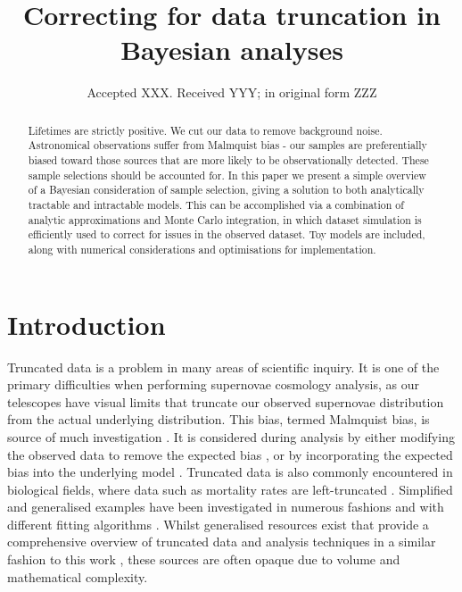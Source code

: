 \documentclass[a4paper,fleqn,usenatbib]{mnras}
\title[Correcting for data truncation in Bayesian analyses]{Correcting for data truncation in Bayesian analyses}
\author[S. R. Hinton et al.]{Samuel R. Hinton,$^{1,2}$\thanks{E-mail: \href{samuelreay@gmail.com}}
	Alex Kim,$^{3}$
	Tamara M. Davis,$^{1,2}$
\\
$^{1}$School of Mathematics and Physics, The University of Queensland, Brisbane, QLD 4072, Australia\\
$^{2}$ARC Centre of Excellence for All-sky Astrophysics (CAASTRO)\\
$^{3}$Lawrence Berkeley National Labs
}
\date{Accepted XXX. Received YYY; in original form ZZZ}
\begin{document}
\label{firstpage}
\pagerange{\pageref{firstpage}--\pageref{lastpage}}
\maketitle





\begin{abstract}
Lifetimes are strictly positive. We cut our data to remove background noise.  Astronomical observations suffer from Malmquist bias - our samples are preferentially biased toward those sources that are more likely to be observationally detected. These sample selections should be accounted for. In this paper we present a simple overview of a Bayesian consideration of sample selection, giving a solution to both analytically tractable and intractable models. This can be accomplished via a combination of analytic approximations and Monte Carlo integration, in which dataset simulation is efficiently used to correct for issues in the observed dataset. Toy models are included, along with numerical considerations and optimisations for implementation.
\end{abstract}








\section{Introduction}

Truncated data is a problem in many areas of scientific inquiry. It is one of the primary difficulties when performing supernovae cosmology analysis, as our telescopes have visual limits that truncate our observed supernovae distribution from the actual underlying distribution. This bias, termed Malmquist bias, is source of much investigation \citep{Butkevich2005}. It is considered during analysis by either modifying the observed data to remove the expected bias \citep{BetouleKessler2014, ConleyGuySullivan2011}, or by incorporating the expected bias into the underlying model \citep{Rubin2015}. Truncated data is also commonly encountered in biological fields, where data such as mortality rates are left-truncated \citep{JANE1898}. Simplified and generalised examples have been investigated in numerous fashions \citep{woodroofe1985estimating, Gull1989bayesian, grogger1991models, o1995truncated} and with different fitting algorithms \citep{Gelfand1992}. Whilst generalised resources exist that provide a comprehensive overview of truncated data and analysis techniques in a similar fashion to this work \citep{klein2005survival}, these sources are often opaque due to volume and mathematical complexity. 
\end{document}
